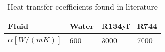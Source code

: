 \begin{table}[h!]
\centering
\caption{Heat transfer coefficients found in literature}\vspace{2mm}
\label{tab:alphas} 
\begin{tabular}{llll}
	\toprule
	Fluid             & Water & R134yf & R744 \\ \midrule
	$\alpha [W/(mK)]$ & 600   & 3000   & 7000 \\ \bottomrule
\end{tabular}
\end{table}